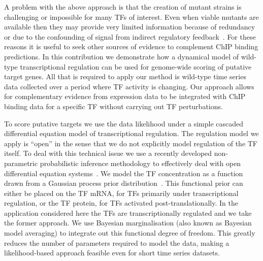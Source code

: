 \documentclass{pnastwo}
\begin{document}
\begin{article}
A problem with the above approach is that the creation of mutant
strains is challenging or impossible for many TFs of interest. Even
when viable mutants are available then they may provide very limited information because of redundancy or due to the
confounding of signal from indirect regulatory feedback~\cite{Gitter2009}. For these reasons it
is useful to seek other sources of evidence to complement ChIP binding
predictions. In this contribution we demonstrate how a dynamical model of wild-type transcriptional
regulation can be used for genome-wide scoring of putative target genes. All that is required to apply
our method is wild-type time series data collected over a period
where TF activity is changing. Our approach allows for complementary
evidence from expression data to be integrated with ChIP binding data
for a specific TF without carrying out TF perturbations. 

To score putative targets we use the data likelihood under a simple
cascaded differential equation model of transcriptional regulation. The regulation model
we apply is ``open'' in the sense that we do not explicitly model regulation of the TF
itself. To deal with this technical issue we use a recently developed
non-parametric probabilistic inference methodology to
effectively deal with open differential equation
systems~\cite{Gao2008}. We model the TF concentration as a function
drawn from a Gaussian process prior distribution~\cite{Rasmussen2006}. This functional prior can either be placed
on the TF mRNA, for TFs primarily under transcriptional regulation,
or the TF protein, for TFs activated post-translationally. In the
application considered here the TFs are transcriptionally regulated
and we take the former approach. We use Bayesian marginalisation (also
known as Bayesian model averaging) to
integrate out this functional degree of freedom. This greatly reduces the
number of parameters required to model the data, making a
likelihood-based approach feasible even for short time series
datasets. 


\end{article}
\end{document}
